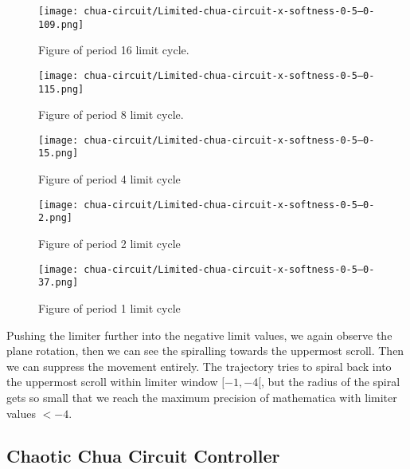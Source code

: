 \documentclass[main]{subfiles}
\begin{document}
\begin{figure}[H]
\centering
\texttt{[image: chua-circuit/Limited-chua-circuit-x-softness-0-5--0-109.png]}
\caption[Figure of period 16 limit cycle]{Figure of period 16 limit cycle.}
\label{figure:x-0.5-16-limit-cycle-upperscroll-trajectory}
\end{figure}

\begin{figure}[H]
\centering
\texttt{[image: chua-circuit/Limited-chua-circuit-x-softness-0-5--0-115.png]}
\caption[Figure of period 8 limit cycle]{Figure of period 8 limit cycle.}
\label{figure:x-0.5-8-limit-cycle-upperscroll-trajectory}
\end{figure}

\begin{figure}[H]
\centering
\texttt{[image: chua-circuit/Limited-chua-circuit-x-softness-0-5--0-15.png]}
\caption[Figure of period 4 limit cycle]{Figure of period 4 limit cycle}
\label{figure:x-0.5-4-limit-cycle-upperscroll-trajectory}
\end{figure}

\begin{figure}[H]
\centering
\texttt{[image: chua-circuit/Limited-chua-circuit-x-softness-0-5--0-2.png]}
\caption[Figure of period 3 limit cycle]{Figure of period 2 limit cycle}
\label{figure:x-0.5-2-limit-cycle-upperscroll-trajectory}
\end{figure}

\begin{figure}[H]
\centering
\texttt{[image: chua-circuit/Limited-chua-circuit-x-softness-0-5--0-37.png]}
\caption[Figure of period 1 limit cycle]{Figure of period 1 limit cycle}
\label{figure:x-0.5-1-limit-cycle-upperscroll-trajectory}
\end{figure}

Pushing the limiter further into the negative limit values, we again observe the plane rotation, then we can see the spiralling towards the uppermost scroll. %
%
Then we can suppress the movement entirely. %
%
The trajectory tries to spiral back into the uppermost scroll within limiter window \([-1,-4[\), but the radius of the spiral gets so small that we reach the maximum precision of mathematica with limiter values \(<-4\).

\subsection{Chaotic Chua Circuit Controller}
\end{document}
